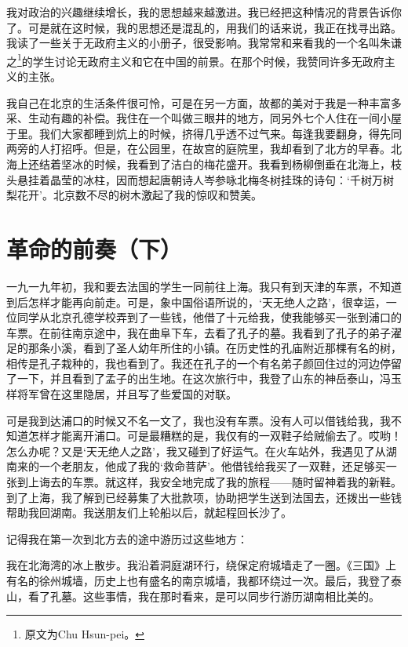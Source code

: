 \documentclass[10pt]{book}
\begin{document}
我对政治的兴趣继续增长，我的思想越来越激进。我已经把这种情况的背景告诉你了。可是就在这时候，我的思想还是混乱的，用我们的话来说，我正在找寻出路。我读了一些关于无政府主义的小册子，很受影响。我常常和来看我的一个名叫朱谦之\footnote{原文为Chu Hsun-pei。}的学生讨论无政府主义和它在中国的前景。在那个时候，我赞同许多无政府主义的主张。

我自己在北京的生活条件很可怜，可是在另一方面，故都的美对于我是一种丰富多采、生动有趣的补偿。我住在一个叫做三眼井的地方，同另外七个人住在一间小屋于里。我们大家都睡到炕上的时候，挤得几乎透不过气来。每逢我要翻身，得先同两旁的人打招呼。但是，在公园里，在故宫的庭院里，我却看到了北方的早春。北海上还结着坚冰的时候，我看到了洁白的梅花盛开。我看到杨柳倒垂在北海上，枝头悬挂着晶莹的冰柱，因而想起唐朝诗人岑参咏北梅冬树挂珠的诗句：‘千树万树梨花开’。北京数不尽的树木激起了我的惊叹和赞美。



\section{革命的前奏（下）}

一九一九年初，我和要去法国的学生一同前往上海。我只有到天津的车票，不知道到后怎样才能再向前走。可是，象中国俗语所说的，‘天无绝人之路’，很幸运，一位同学从北京孔德学校弄到了一些钱，他借了十元给我，使我能够买一张到浦口的车票。在前往南京途中，我在曲阜下车，去看了孔子的墓。我看到了孔子的弟子濯足的那条小溪，看到了圣人幼年所住的小镇。在历史性的孔庙附近那棵有名的树，相传是孔子栽种的，我也看到了。我还在孔子的一个有名弟子颜回住过的河边停留了一下，并且看到了孟子的出生地。在这次旅行中，我登了山东的神岳泰山，冯玉样将军曾在这里隐居，并且写了些爱国的对联。

可是我到达浦口的时候又不名一文了，我也没有车票。没有人可以借钱给我，我不知道怎样才能离开浦口。可是最糟糕的是，我仅有的一双鞋子给贼偷去了。哎哟！怎么办呢？又是‘天无绝人之路’，我又碰到了好运气。在火车站外，我遇见了从湖南来的一个老朋友，他成了我的‘救命菩萨’。他借钱给我买了一双鞋，还足够买一张到上诲去的车票。就这样，我安全地完成了我的旅程——随时留神着我的新鞋。到了上海，我了解到已经募集了大批款项，协助把学生送到法国去，还拨出一些钱帮助我回湖南。我送朋友们上轮船以后，就起程回长沙了。

记得我在第一次到北方去的途中游历过这些地方：

我在北海湾的冰上散步。我沿着洞庭湖环行，绕保定府城墙走了一圈。《三国》上有名的徐州城墙，历史上也有盛名的南京城墙，我都环绕过一次。最后，我登了泰山，看了孔墓。这些事情，我在那时看来，是可以同步行游历湖南相比美的。
\end{document}
